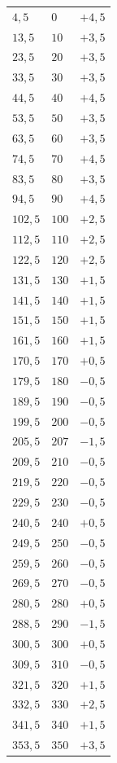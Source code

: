 {\begin{longtable}{C{3.2cm} C{3.2cm} C{3.2cm}}
$4{,}5$ & $0$ & $+4{,}5$ \\
$13{,}5$ & $10$ & $+3{,}5$ \\
$23{,}5$ & $20$ & $+3{,}5$ \\
$33{,}5$ & $30$ & $+3{,}5$ \\
$44{,}5$ & $40$ & $+4{,}5$ \\
$53{,}5$ & $50$ & $+3{,}5$ \\
$63{,}5$ & $60$ & $+3{,}5$ \\
$74{,}5$ & $70$ & $+4{,}5$ \\
$83{,}5$ & $80$ & $+3{,}5$ \\
$94{,}5$ & $90$ & $+4{,}5$ \\
$102{,}5$ & $100$ & $+2{,}5$ \\
$112{,}5$ & $110$ & $+2{,}5$ \\
$122{,}5$ & $120$ & $+2{,}5$ \\
$131{,}5$ & $130$ & $+1{,}5$ \\
$141{,}5$ & $140$ & $+1{,}5$ \\
$151{,}5$ & $150$ & $+1{,}5$ \\
$161{,}5$ & $160$ & $+1{,}5$ \\
$170{,}5$ & $170$ & $+0{,}5$ \\
$179{,}5$ & $180$ & $-0{,}5$ \\
$189{,}5$ & $190$ & $-0{,}5$ \\
$199{,}5$ & $200$ & $-0{,}5$ \\
$205{,}5$ & $207$ & $-1{,}5$ \\
$209{,}5$ & $210$ & $-0{,}5$ \\
$219{,}5$ & $220$ & $-0{,}5$ \\
$229{,}5$ & $230$ & $-0{,}5$ \\
$240{,}5$ & $240$ & $+0{,}5$ \\
$249{,}5$ & $250$ & $-0{,}5$ \\
$259{,}5$ & $260$ & $-0{,}5$ \\
$269{,}5$ & $270$ & $-0{,}5$ \\
$280{,}5$ & $280$ & $+0{,}5$ \\
$288{,}5$ & $290$ & $-1{,}5$ \\
$300{,}5$ & $300$ & $+0{,}5$ \\
$309{,}5$ & $310$ & $-0{,}5$ \\
$321{,}5$ & $320$ & $+1{,}5$ \\
$332{,}5$ & $330$ & $+2{,}5$ \\
$341{,}5$ & $340$ & $+1{,}5$ \\
$353{,}5$ & $350$ & $+3{,}5$ \\

\end{longtable}
}

